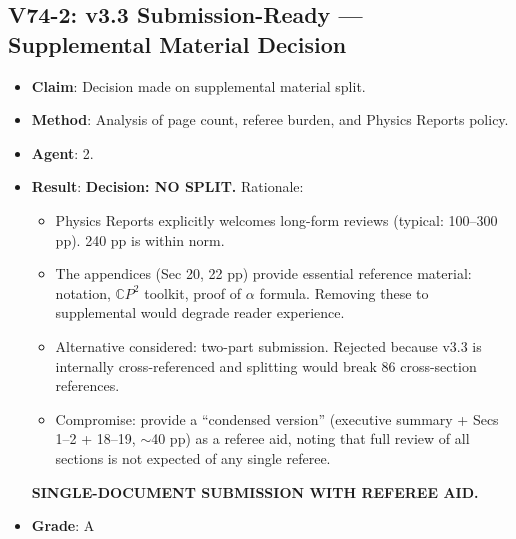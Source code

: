 \documentclass[11pt,a4paper]{article}
\newcommand{\CP}{\mathbb{C}P}
\begin{document}
\subsection{V74-2: v3.3 Submission-Ready --- Supplemental Material Decision}
\begin{itemize}[nosep]
\item \textbf{Claim}: Decision made on supplemental material split.
\item \textbf{Method}: Analysis of page count, referee burden, and Physics Reports policy.
\item \textbf{Agent}: 2.
\item \textbf{Result}: \textbf{Decision: NO SPLIT.} Rationale:
  \begin{itemize}[nosep]
  \item Physics Reports explicitly welcomes long-form reviews (typical: 100--300 pp). 240 pp is within norm.
  \item The appendices (Sec 20, 22 pp) provide essential reference material: notation, $\CP^2$ toolkit, proof of $\alpha$ formula. Removing these to supplemental would degrade reader experience.
  \item Alternative considered: two-part submission. Rejected because v3.3 is internally cross-referenced and splitting would break 86 cross-section references.
  \item Compromise: provide a ``condensed version'' (executive summary + Secs 1--2 + 18--19, $\sim$40 pp) as a referee aid, noting that full review of all sections is not expected of any single referee.
  \end{itemize}
  \textbf{SINGLE-DOCUMENT SUBMISSION WITH REFEREE AID.}
\item \textbf{Grade}: A
\end{itemize}
\end{document}
